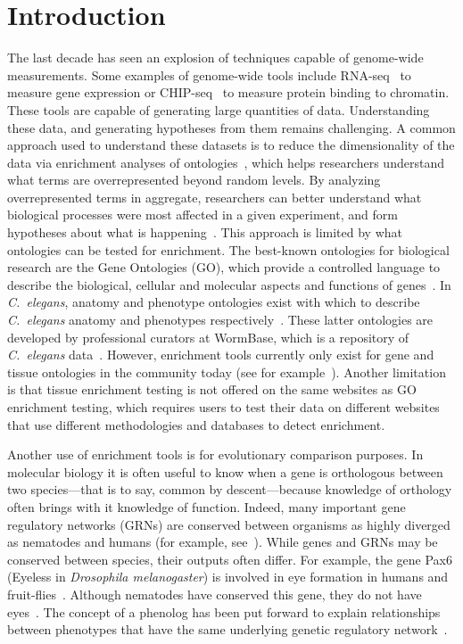 \documentclass[10pt, onecolumn]{article}
\newcommand{\cel}{\emph{C.~elegans}}
\begin{document}
\section*{Introduction}
The last decade has seen an explosion of techniques capable of genome-wide
measurements. Some examples of genome-wide tools include
RNA-seq~\cite{Mortazavi2008} to measure gene expression or
CHIP-seq~\cite{Johnson2007} to measure protein binding to chromatin. These tools
are capable of generating large quantities of data. Understanding these data,
and generating hypotheses from them remains challenging. A common approach used
to understand these datasets is to reduce the dimensionality of the data via
enrichment analyses of ontologies~\cite{TheGeneOntologyConsortium2000a}, which
helps researchers understand what terms are overrepresented beyond random
levels. By analyzing overrepresented terms in aggregate, researchers can better
understand what biological processes were most affected in a given experiment,
and form hypotheses about what is happening~\cite{Rhee2008}. This approach is
limited by what ontologies can be tested for enrichment. The best-known ontologies
for biological research are the Gene Ontologies (GO), which provide a controlled
language to describe the biological, cellular and molecular aspects and functions of
genes~\cite{TheGeneOntologyConsortium2000a}. In \cel{}, anatomy and
phenotype ontologies exist with which to describe \cel{} anatomy and phenotypes
respectively~\cite{Schindelman2011,Lee2003}. These latter ontologies are developed by
professional curators at WormBase, which is a repository of \cel{}
data~\cite{Howe2016}. However, enrichment tools currently only exist for gene and tissue
ontologies in the community today (see for
example~\cite{Chikina2009,Mi2013,Angeles-Albores2016}). Another limitation is
that tissue enrichment testing is not offered on the same websites as GO
enrichment testing, which requires users to test their data on different
websites that use different methodologies and databases to detect enrichment.

Another use of enrichment tools is for evolutionary comparison purposes.
In molecular biology it is often useful to know when a gene is orthologous
between two species---that is to say, common by descent---because knowledge of
orthology often brings with it knowledge of function. Indeed, many
important gene regulatory networks (GRNs) are conserved between organisms as
highly diverged as nematodes and humans (for example, see~\cite{Sternberg1998}).
While genes and GRNs may be conserved between species, their outputs often differ.
For example, the gene Pax6 (Eyeless in \emph{Drosophila melanogaster})
is involved in eye formation in humans and fruit-flies~\cite{Quiring1994}. Although
nematodes have conserved this gene, they do not have eyes~\cite{Zhang1995,Chisholm1995}.
The concept of a phenolog has been put forward to explain relationships between
phenotypes that have the same underlying genetic
regulatory network~\cite{McGary2010,Lehner2013}.
\end{document}
